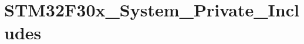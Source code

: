 \hypertarget{group___s_t_m32_f30x___system___private___includes}{\section{S\-T\-M32\-F30x\-\_\-\-System\-\_\-\-Private\-\_\-\-Includes}
\label{group___s_t_m32_f30x___system___private___includes}
}
